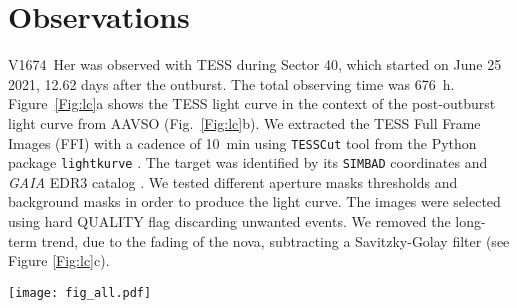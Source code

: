\documentclass[baaa]{baaa}
\begin{document}
\section{Observations} 
\label{sec:obs}

V1674~Her was observed with TESS during Sector 40, which started on June 25 2021, 12.62 days after the outburst. The total observing time was 676~h. Figure~\ref{Fig:lc}a shows the TESS light curve in the context of the post-outburst light curve from AAVSO (Fig.~\ref{Fig:lc}b). We extracted the TESS Full Frame Images (FFI) with a cadence of 10~min using {\tt TESSCut} tool \citep{Brasseur_2019} from the Python package {\tt lightkurve} \citep{Lightkurve_2018}. 
The target was identified by its {\tt SIMBAD} coordinates and {\em GAIA} EDR3 catalog \citep{2021A&A...649A...1G}. We tested different aperture masks thresholds and background masks in order to produce the 
light curve.  The images were selected using hard QUALITY flag discarding unwanted events. We removed the long-term trend, due to the fading of the nova, subtracting a Savitzky-Golay filter \citep{Savitzky_1964} (see Figure \ref{Fig:lc}c). 

\begin{figure*}
\texttt{[image: fig\_all.pdf]} \caption{{\em Panel (a):} TESS light curve of V1674~Her observed during Sector 40, 13 days after outburst. {\em Panel (b):} AAVSO, V-magnitud light curve of V1674~Her after outburst on June 12 2021. In both cases the error bars are smaller than the symbol size and thus are not included. {\em Panel (c):} TESS light curve with a Savitzky-Golay (SG) filter (red line) to remove the long-term trend.  {\em Panel (d):} TESS light curve after applying the SG filter. {\em Panel (e):} Lomb-Scargle power spectrum of the TESS~-SG light curve. The red vertical line marks the frequency of the orbital period at P$_{orb}$=0.1529(1) days.  {\em Panel (f):} Lomb-Scargle power spectra of each 3-day portion of light curve. Colors correspond to the colors in Panel (d). The 3-day portions of the light curve were extracted from a moving window with 50\% overlap.  The orbital period is significantly detected after day $\sim$ 17. {\em Panel (g):} TESS light curve folded at the orbital period P$_{orb}$=0.1529 days. The light curve was binned at 80 bins/period. {\em Panel (h):} TESS light curve folded at period P=0.537 days with arbitrary ephemeris. The light curve was binned at 40 bins/period.}
\label{Fig:lc}
\end{figure*}
\end{document}
